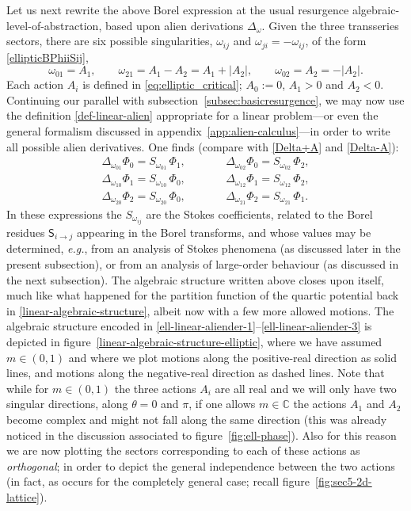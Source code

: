 \documentclass[11pt,a4paper]{article}
\def\BC{{\mathbb C}}
\begin{document}
Let us next rewrite the above Borel expression at the usual resurgence algebraic-level-of-abstraction, based upon alien derivations $\Delta_\omega$. Given the three transseries sectors, there are six possible singularities, $\omega_{ij}$ and $\omega_{ji} = -\omega_{ij}$, of the form \eqref{ellipticBPhiiSij},
%
\begin{equation}
\label{ell-singularities}
\omega_{01} = A_1, \qquad \omega_{21} = A_1 - A_2 = A_1 + |A_2|, \qquad \omega_{02} = A_2 = - |A_2|. 
\end{equation}
%
\noindent
Each action $A_i$ is defined in \eqref{eq:elliptic_critical}; $A_0:=0$, $A_1>0$ and $A_2<0$. Continuing our parallel with subsection~\ref{subsec:basicresurgence}, we may now use the definition \eqref{def-linear-alien} appropriate for a linear problem---or even the general formalism discussed in appendix~\ref{app:alien-calculus}---in order to write all possible alien derivatives. One finds (compare with \eqref{Delta+A} and \eqref{Delta-A}):
%
\begin{eqnarray}
\label{ell-linear-aliender-1}
\Delta_{\omega_{01}} \Phi_0 = S_{\omega_{01}}\, \Phi_1, & & \qquad \Delta_{\omega_{02}} \Phi_0 = S_{\omega_{02}}\, \Phi_2, \\
\label{ell-linear-aliender-2}
\Delta_{\omega_{10}} \Phi_1 = S_{\omega_{10}}\, \Phi_0, & & \qquad  \Delta_{\omega_{12}} \Phi_1 = S_{\omega_{12}}\, \Phi_2, \\
\label{ell-linear-aliender-3}
\Delta_{\omega_{20}} \Phi_2 = S_{\omega_{20}}\, \Phi_0, & & \qquad \Delta_{\omega_{21}} \Phi_2 = S_{\omega_{21}}\, \Phi_1.
\end{eqnarray}
%
\noindent
In these expressions the $S_{\omega_{ij}}$ are the Stokes coefficients, related to the Borel residues $\mathsf{S}_{i\to j}$ appearing in the Borel transforms, and whose values may be determined, \textit{e.g.}, from an analysis of Stokes phenomena (as discussed later in the present subsection), or from an analysis of large-order behaviour (as discussed in the next subsection). The algebraic structure written above closes upon itself, much like what happened for the partition function of the quartic potential back in \eqref{linear-algebraic-structure}, albeit now with a few more allowed motions. The algebraic structure encoded in \eqref{ell-linear-aliender-1}--\eqref{ell-linear-aliender-3} is depicted in figure~\ref{linear-algebraic-structure-elliptic}, where we have assumed $m \in \left(0,1\right)$ and where we plot motions along the positive-real direction as solid lines, and motions along the negative-real direction as dashed lines. Note that while for $m \in \left(0,1\right)$ the three actions $A_i$ are all real and we will only have two singular directions, along $\theta=0$ and $\pi$, if one allows $m \in \BC$ the actions $A_1$ and $A_2$ become complex and might not fall along the same direction (this was already noticed in the discussion associated to figure~\ref{fig:ell-phase}). Also for this reason we are now plotting the sectors corresponding to each of these actions as \textit{orthogonal}; in order to depict the general independence between the two actions (in fact, as occurs for the completely general case; recall figure~\ref{fig:sec5-2d-lattice}).
\end{document}

